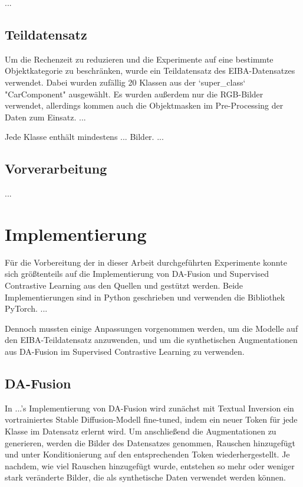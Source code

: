 ...

\subsection{Teildatensatz}

Um die Rechenzeit zu reduzieren und die Experimente auf eine bestimmte Objektkategorie zu beschränken, wurde ein Teildatensatz des EIBA-Datensatzes verwendet. Dabei wurden zufällig 20 Klassen aus der `super_class` "CarComponent" ausgewählt. Es wurden außerdem nur die RGB-Bilder verwendet, allerdings kommen auch die Objektmasken im Pre-Processing der Daten zum Einsatz. ...

Jede Klasse enthält mindestens ... Bilder. ...

\subsection{Vorverarbeitung}

...

\section{Implementierung}

Für die Vorbereitung der in dieser Arbeit durchgeführten Experimente konnte sich größtenteils auf die Implementierung von DA-Fusion und Supervised Contrastive Learning aus den Quellen \cite{...} und \cite{...} gestützt werden. Beide Implementierungen sind in Python geschrieben und verwenden die Bibliothek PyTorch. ...

Dennoch mussten einige Anpassungen vorgenommen werden, um die Modelle auf den EIBA-Teildatensatz anzuwenden, und um die synthetischen Augmentationen aus DA-Fusion im Supervised Contrastive Learning zu verwenden.

\subsection{DA-Fusion}

In ...'s Implementierung von DA-Fusion wird zunächst mit Textual Inversion ein vortrainiertes Stable Diffusion-Modell fine-tuned, indem ein neuer Token für jede Klasse im Datensatz erlernt wird. Um anschließend die Augmentationen zu generieren, werden die Bilder des Datensatzes genommen, Rauschen hinzugefügt und unter Konditionierung auf den entsprechenden Token wiederhergestellt. Je nachdem, wie viel Rauschen hinzugefügt wurde, entstehen so mehr oder weniger stark veränderte Bilder, die als synthetische Daten verwendet werden können.

